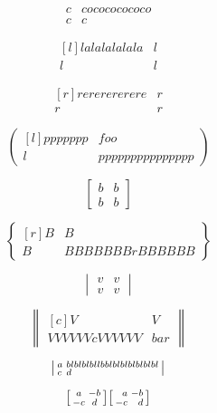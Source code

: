 \documentclass{article}
\newcommand{\horz}{\noindent\makebox[\linewidth]{\rule{\paperwidth}{0.4pt}}}
\begin{document}
\horz

\[
\begin{matrix*}
c & cocococococo \\
c & c
\end{matrix*}
\]

\[
\begin{matrix*}[l]
lalalalalala & l \\
l & l
\end{matrix*}
\]

\[
\begin{matrix*}[r]
rererererere & r \\
r & r
\end{matrix*}
\]

\horz

\[
\begin{pmatrix*}[l]
ppppppp & foo \\
l & ppppppppppppppp
\end{pmatrix*}
\]

\[
\begin{bmatrix*}
b & b \\
b & b
\end{bmatrix*}
\]

\[
\begin{Bmatrix*}[r]
B & B \\
B & BBBBBBBrBBBBBB
\end{Bmatrix*}
\]

\[
\begin{vmatrix*}
v & v \\
v & v
\end{vmatrix*}
\]

\[
\begin{Vmatrix*}[c]
V & V \\
VVVVVVcVVVVVV & bar
\end{Vmatrix*}
\]

\horz

\[
\begin{vsmallmatrix*}[l]
a & blblblbllbblblblblblblbl \\
c & d
\end{vsmallmatrix*}
\]

\[
\begin{bsmallmatrix} a & -b \\ -c & d \end{bsmallmatrix}
\begin{bsmallmatrix*}[r] a & -b \\ -c & d \end{bsmallmatrix*}
\]
\end{document}
